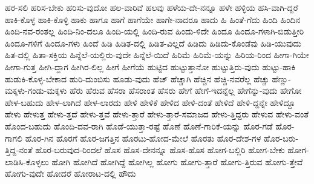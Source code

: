 {ಹರ-ಸಲಿ
ಹರಿಸ-ಬೇಕು
ಹರಿಸು-ವುದೋ
ಹಲ-ವಾರಿವೆ
ಹಲವು
ಹಳೆಯ-ದೇ-ನನ್ನೂ
ಹಳೇ
ಹಳ್ಳಿಯ
ಹಸಿ-ವಾಗಿ-ದ್ದರೆ
ಹಾಕಿ-ಕೊಳ್ಳ
ಹಾಕಿ-ಕೊಳ್ಳಿ
ಹಾಕು
ಹಾಗೂ
ಹಾಗೆ
ಹಾಗೆಯೇ
ಹಾಗೇ-ನಾದರೂ
ಹಾದು
ಹಿ
ಹಿಂತೆ-ಗೆದು
ಹಿಂದಿ
ಹಿಂದಿನ
ಹಿಂದಿ-ನವ-ರಂತಲ್ಲ
ಹಿಂದಿ-ನಿಂ-ದಲೂ
ಹಿಂದಿ-ಯಲ್ಲಿ
ಹಿಂದಿ-ರುವ
ಹಿಂದು-ಳಿದೇ
ಹಿಂದೂ
ಹಿಂದೂ-ಗಳಾಗಿ-ಬಿಡುತ್ತೀರಿ
ಹಿಂದೂ-ಗಳಿಗೆ
ಹಿಂದೂ-ಗಳು
ಹಿಂದೆ
ಹಿಡಿ
ಹಿಡಿತ-ದಲ್ಲಿ
ಹಿಡಿತ-ವಿಲ್ಲದೆ
ಹಿಡಿದು
ಹಿಡಿದು-ಕೊಂಡೆವು
ಹಿಡಿ-ಯುವುದು
ಹಿತ-ದಲ್ಲಿ
ಹಿತಾ-ಸಕ್ತಿಯ
ಹಿನ್ನೆಲೆ-ಯಲ್ಲಿರು-ವುದೇ
ಹಿನ್ನೆಲೆ-ಯಿದೆ
ಹಿರಿಮೆ
ಹಿರಿಮೆ-ಯನ್ನು
ಹಿರಿಯ-ರಿಂದ
ಹೀಗಾ-ಗಿಯೇ
ಹೀಗಾ-ಗುತ್ತ
ಹೀಗಿ-ದ್ದಾಗ
ಹೀಗಿರ-ಲಿಲ್ಲ
ಹೀಗೆ
ಹೀಗೆಯೆ
ಹುಟ್ಟಿದ
ಹುಟ್ಟುತ್ತಾನೋ
ಹುಟ್ಟುತ್ತಿರು-ವುದು
ಹುಟ್ಟು-ಹಾಕಿ
ಹುಡುಕಿ-ಕೊಳ್ಳ-ಬೇಕಾದ
ಹುರಿ-ದುಂಬಿಸು
ಹೂಡು-ವುದು
ಹೆಚ್
ಹೆಚ್ಚಾಗಿ
ಹೆಚ್ಚಿನ
ಹೆಚ್ಚಿ-ನವರೆಲ್ಲ
ಹೆಚ್ಚು
ಹೆಣ್ಣು-ಮಕ್ಕಳು-ಗಂಡು-ಮಕ್ಕಳು
ಹೆರು
ಹೆರುವ
ಹೆಸರಾ
ಹೆಸರಾಂತ
ಹೆಸರು
ಹೇಗೆ
ಹೇಗೆ-ಇದನ್ನೆಲ್ಲ
ಹೇಗೆನ್ನು-ವುದು
ಹೇಗೋ
ಹೇಳ-ಬಹುದು
ಹೇಳ-ಲಾಗಿದೆ
ಹೇಳ-ಲಾರದು
ಹೇಳಿ
ಹೇಳಿಕೆ
ಹೇಳಿದ
ಹೇಳಿ-ದಂತೆ
ಹೇಳಿದೆ
ಹೇಳಿ-ದ್ದನ್ನೇ
ಹೇಳಿದ್ದೂ
ಹೇಳು
ಹೇಳುತ್ತ
ಹೇಳು-ತ್ತದೆ
ಹೇಳು-ತ್ತವೆ
ಹೇಳು-ತ್ತಾರೆ
ಹೇಳು-ತ್ತಾರೆ-ಸಮಾಜದ
ಹೇಳು-ತ್ತಿದ್ದರು
ಹೇಳುವ
ಹೇಳು-ವಂತೆ
ಹೊಂದ-ಬಹುದು
ಹೊಂದಿ-ದವ-ರಾಗಿ
ಹೊಡೆ-ಯುತ್ತಾ-ರಷ್ಟೆ
ಹೊಣೆ
ಹೊಣೆ-ಗಾರಿಕೆ-ಯನ್ನು
ಹೊರ-ಗಡೆ
ಹೊರ-ಗಾಗಲಿ
ಹೊರ-ಗಿನ
ಹೊರಗೆ
ಹೊರ-ಜಗತ್ತಿನ
ಹೊರಟು-ಹೋದ-ಮೇಲೆ
ಹೊರತು
ಹೊರ-ದೇಶ-ಗಳ
ಹೊರ-ಬರು-ತ್ತಿದ್ದ-ನಂತೆ
ಹೊರ-ಬರುವುದ-ರಿಂದಲೆ
ಹೊಸ
ಹೊಸ-ದೇನನ್ನೂ
ಹೊಸ-ಹೊಸ
ಹೋಗ-ಬಲ್ಲಿರಿ
ಹೋಗ-ಬೇಕು
ಹೋಗ-ಲಾಡಿಸಿ-ಕೊಳ್ಳಲು
ಹೋಗಿ
ಹೋಗಿದೆ
ಹೋಗಿದ್ದೆ
ಹೋಗಿಲ್ಲ
ಹೋಗು
ಹೋಗು-ತ್ತಾರೆ
ಹೋಗು-ತ್ತಿರುವ
ಹೋಗು-ತ್ತೇವೆ
ಹೋಗು-ವುದೇ
ಹೋದರೆ
ಹೋರಾಟ-ದಲ್ಲಿ
ಹೌದು
}

